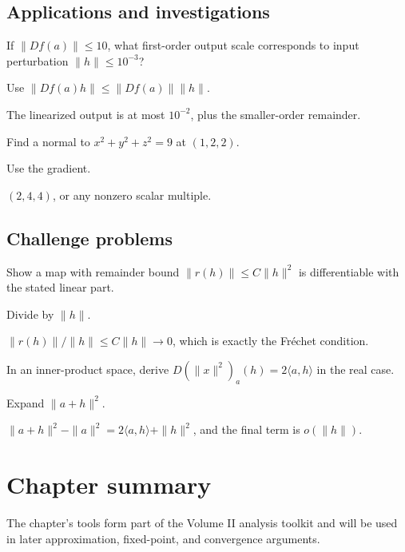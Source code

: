 \subsection*{Applications and investigations}

\begin{exercise}\label{exr:ii08-expand-13}
If \(\|Df(a)\|\le10\), what first-order output scale corresponds to input perturbation \(\|h\|\le10^{-3}\)?
\end{exercise}
\begin{hint}
Use \(\|Df(a)h\|\le\|Df(a)\|\|h\|\).
\end{hint}
\begin{solution}
The linearized output is at most \(10^{-2}\), plus the smaller-order remainder.
\end{solution}

\begin{exercise}\label{exr:ii08-expand-14}
Find a normal to \(x^2+y^2+z^2=9\) at \((1,2,2)\).
\end{exercise}
\begin{hint}
Use the gradient.
\end{hint}
\begin{solution}
\((2,4,4)\), or any nonzero scalar multiple.
\end{solution}

\subsection*{Challenge problems}

\begin{exercise}\label{exr:ii08-expand-15}
Show a map with remainder bound \(\|r(h)\|\le C\|h\|^2\) is differentiable with the stated linear part.
\end{exercise}
\begin{hint}
Divide by \(\|h\|\).
\end{hint}
\begin{solution}
\(\|r(h)\|/\|h\|\le C\|h\|\to0\), which is exactly the Fréchet condition.
\end{solution}

\begin{exercise}\label{exr:ii08-expand-16}
In an inner-product space, derive \(D(\|x\|^2)_a(h)=2\langle a,h\rangle\) in the real case.
\end{exercise}
\begin{hint}
Expand \(\|a+h\|^2\).
\end{hint}
\begin{solution}
\(\|a+h\|^2-\|a\|^2=2\langle a,h\rangle+\|h\|^2\), and the final term is \(o(\|h\|)\).
\end{solution}
\section*{Chapter summary}
The chapter's tools form part of the Volume II analysis toolkit and will be used in later approximation, fixed-point, and convergence arguments.

